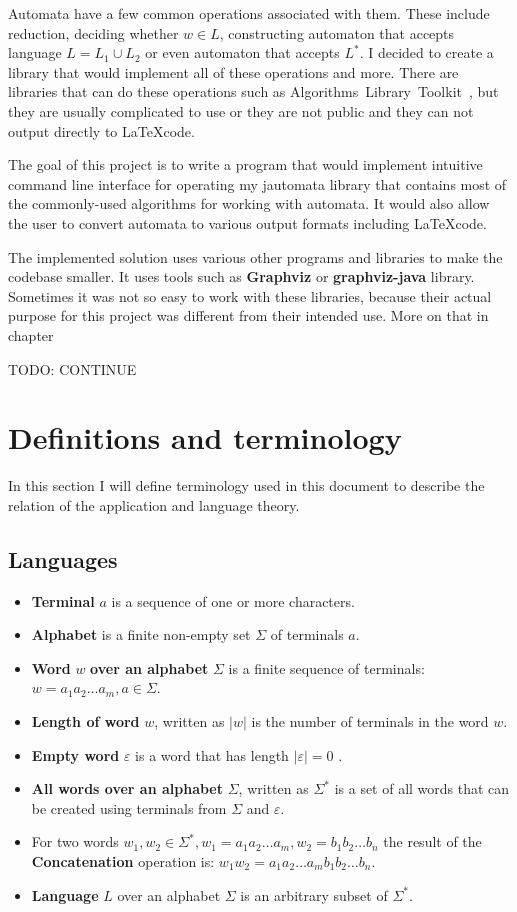 \documentclass{ctuthesis}
\begin{document}
Automata have a few common operations associated with them. These include reduction, deciding whether $w \in L$, constructing automaton that accepts language $L = L_1 \cup L_2$ or even automaton that accepts $L^*$. I decided to create a library that would implement all of these operations and more. There are libraries that can do these operations such as Algorithms~Library~Toolkit~\cite{alg_lib_toolkit}, but they are usually complicated to use or they are not public and they can not output directly to \LaTeX code. 

The goal of this project is to write a program that would implement intuitive command line interface for operating my jautomata library that contains most of the commonly-used algorithms for working with automata. It would also allow the user to convert automata to various output formats including \LaTeX code.

The implemented solution uses various other programs and libraries to make the codebase smaller. It uses tools such as \textbf{Graphviz} %
or \textbf{graphviz-java} %
library. Sometimes it was not so easy to work with these libraries, because their actual purpose for this project was different from their intended use. More on that in chapter %

TODO: CONTINUE

\chapter{Definitions and terminology}
In this section I will define terminology used in this document to describe the relation of the application and language theory. 
 
\section{Languages}
\begin{itemize}
	\item \textbf{Terminal} $a$ is a sequence of one or more characters.
	\item \textbf{Alphabet} is a finite non-empty set $\Sigma$ of terminals $a$.
	\item \textbf{Word} $w$ \textbf{over an alphabet} $\Sigma$ is a finite sequence of terminals: $w = a_1a_2\ldots a_m, a \in \Sigma$.
	\item \textbf{Length of word} $w$, written as $|w|$ is the number of terminals in the word $w$.
	\item \textbf{Empty word} $\varepsilon$ is a word that has length $|\varepsilon| = 0$ .
	\item \textbf{All words over an alphabet} $\Sigma$, written as $\Sigma^*$ is a set of all words that can be created using terminals from $\Sigma$ and $\varepsilon$.
	\item For two words $w_1, w_2 \in \Sigma^*, w_1 = a_1a_2\ldots a_m, w_2 = b_1b_2\ldots b_n$ the result of the \textbf{Concatenation} operation is: $w_1w_2 = a_1a_2\ldots a_mb_1b_2\ldots b_n$.
	\item \textbf{Language} $L$ over an alphabet $\Sigma$ is an arbitrary subset of $\Sigma^*$.
\end{itemize}
\end{document}
